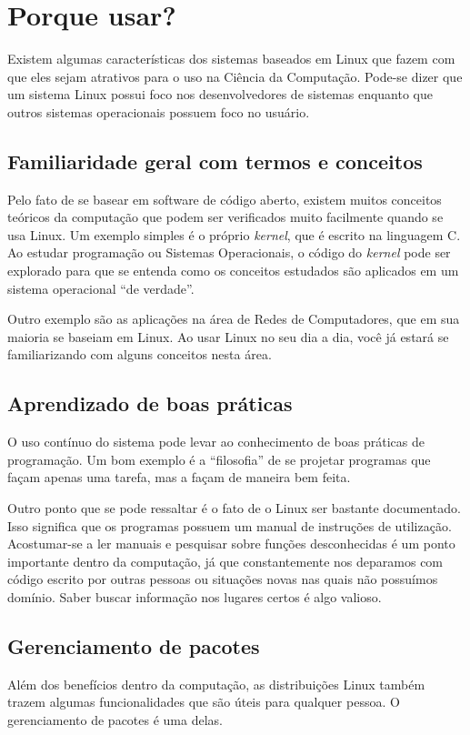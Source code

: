 \documentclass{handout_utfpr}
\begin{document}
\section{Porque usar?}
Existem algumas características dos sistemas baseados em Linux que fazem com que eles sejam atrativos para o uso na Ciência da Computação. Pode-se dizer que um sistema Linux possui foco nos desenvolvedores de sistemas enquanto que outros sistemas operacionais possuem foco no usuário.

\subsection{Familiaridade geral com termos e conceitos}
Pelo fato de se basear em software de código aberto, existem muitos conceitos teóricos da computação que podem ser verificados muito facilmente quando se usa Linux. Um exemplo simples é o próprio \textit{kernel}, que é escrito na linguagem C. Ao estudar programação ou Sistemas Operacionais, o código do \textit{kernel} pode ser explorado para que se entenda como os conceitos estudados são aplicados em um sistema operacional ``de verdade''.

Outro exemplo são as aplicações na área de Redes de Computadores, que em sua maioria se baseiam em Linux. Ao usar Linux no seu dia a dia, você já estará se familiarizando com alguns conceitos nesta área.

\subsection{Aprendizado de boas práticas}
O uso contínuo do sistema pode levar ao conhecimento de boas práticas de programação. Um bom exemplo é a ``filosofia'' de se projetar programas que façam apenas uma tarefa, mas a façam de maneira bem feita.

Outro ponto que se pode ressaltar é o fato de o Linux ser bastante documentado. Isso significa que os programas possuem um manual de instruções de utilização. Acostumar-se a ler manuais e pesquisar sobre funções desconhecidas é um ponto importante dentro da computação, já que constantemente nos deparamos com código escrito por outras pessoas ou situações novas nas quais não possuímos domínio. Saber buscar informação nos lugares certos é algo valioso.

\subsection{Gerenciamento de pacotes}
Além dos benefícios dentro da computação, as distribuições Linux também trazem algumas funcionalidades que são úteis para qualquer pessoa. O gerenciamento de pacotes é uma delas.
\end{document}
